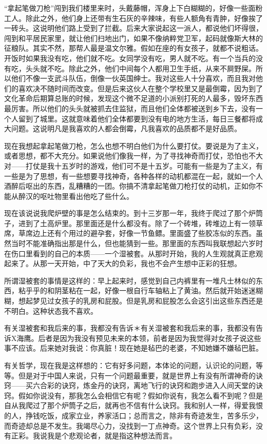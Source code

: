 “拿起笔做刀枪”闯到我们楼里来时，头戴藤帽，浑身上下白糊糊的，好像一些面粉工人。除此之外，他们身上还带有生石灰的辛辣味，有些人额角有青肿，好像挨了一砖头。这说明他们路上受到了拦截。后来大家说起这一派人，都说他们坏得很，闯到和平居民家里，就让他们扫地出门，如果不像纳粹党卫军，起码就像斯大林的征粮队。其实不然，那帮人最是温文尔雅。假如在座的有女孩子，就都不说粗话。开饭时如果我没有吃，他们就不吃。女同学没有吃，男人就不吃。有一个当兵的没有吃，头头就不吃。除此之外，他们中间每个人都用卫生手纸，从来不屙野屎。所以他们不像一支武斗队伍，倒像一伙英国绅士。我对这些人十分喜欢，而且我对他们的喜欢决不随时间而改变。但是后来这伙人在整个学校里又是最倒霉，因为到了文化革命后期算总账的时候，发现这个微不足道的小派别打死的人最多，毁坏东西最厉害。所以他们的头头就被抓去住监狱，而且他们全体都被送到乡下去，没有一个人留到了城里。这就意味着他们全体都要到没有电的地方生活，每日三餐都将成大问题。这说明凡是我喜欢的人都会倒霉，凡我喜欢的品质都不是好品质。 

现在我想起拿起笔做刀枪，怎么也想不明白他们为什么要打仗。要说是为了主义，或者思想，都不大充分。如果说他们像我一样，为了寻找神奇而打仗，恐怕也不大对——打仗是我十五岁时的游戏，他们可不是十五岁。可能有一些是为了主义，有一些是为了思想，有一些想要寻找神奇，各种各样的动机都混在一起，就如一个人酒醉后呕出的东西，乱糟糟的一团。你搞不清拿起笔做刀枪打仗的动机，正如你不能从醉汉的呕吐物里看出他吃了些什么。 

现在该说说我爬炉壁的事是怎么结束的。到十三岁那一年，我终于爬过了那个炉筒子，进到了土高炉里。那里面还是什么都没有。除了一个砖堆，砖堆边上有一领草席，草席边上还有个用过的避孕套，好像一节鱼鳔。里面盛了些胶冻似的东西。虽然当时不能准确指出那是什么，但也能猜到一些。那里面的东西叫我联想起六岁时在伤口里看到的自己的本质——一个湿被套。从那时开始，我的人生观就真正悲观起来了。从那一天开始，中了天大的负彩，我也不会产生想中正彩的狂想。 

所谓湿被套的事情是这样的：早上起来时，感觉到自己内裤里有一堆凡士林似的东西，粘乎乎的和阴茎粘在一起，好像一根自行车轴粘上了黄油。然后就开始迷迷糊糊，想起梦见过女孩子的乳房和屁股。但是乳房和屁股怎么会这引出这些东西还是不明白。这种状态我不喜欢。 

有关湿被套和我后来的事，我都没有告诉＊有关湿被套和我后来的事，我都没有告诉X海鹰。后者是因为我没有预见未来的本领，前者是因为我觉得对女孩子说这些事不应该。后来她对我说：你真脏！现在她是毡巴的老婆，不知她嫌不嫌毡巴脏。 

有关哲学，现在我是这样想的：它有好多问题，本体论的问题，认识论的问题，等等。但是对于中国人来说，只有一个问题最重要，就是世界上有没有所谓神奇的诀窍——买六合彩的诀窍，炼金丹的诀窍，离地飞行的诀窍和跑步进入人间天堂的诀窍。假如你说没有，那我怎么会相信它有呢？假如你说有，我怎么看不到呢？但是自从我爬过了那个炉筒子之后，就再也不信有什么诀窍。我和别人一样，得爱我恨的人，挣钱吃饭，成家立业，养家活口；总而言之，除非有奇迹发生，苦多乐少，而奇迹却总是不发生。我竭尽心力，没找到一丁点神奇。这个世界上只有负彩，没有正彩。我说我是个悲观论者，就是指这种想法而言。

